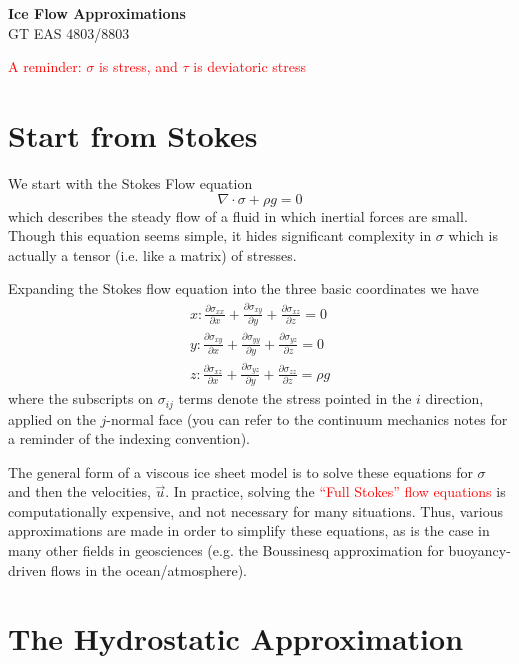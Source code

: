 \documentclass[12pt]{article}
\theoremstyle{definition}
\newcommand{\pd}[2]{\frac{\partial {#1}}{\partial {#2}}}
\begin{document}
\thispagestyle{empty}

\begin{center}
{\LARGE \bf Ice Flow Approximations}\\
{\large GT EAS 4803/8803}\\
\end{center}
\begin{center} \textcolor{red}{A reminder: $\sigma$ is stress, and $\tau$ is deviatoric stress} \end{center}
\section{Start from Stokes}
We start with the Stokes Flow equation
\begin{equation}
\nabla \cdot \sigma + \rho g = 0
\end{equation}
which describes the steady flow of a fluid in which inertial forces are small. Though this equation seems simple, it hides significant complexity in $\sigma$ which is actually a tensor (i.e. like a matrix) of stresses. \\

\begin{shaded}
Expanding the Stokes flow equation into the three basic coordinates we have
\begin{align}
x: \pd{\sigma_{xx}}{x} + \pd{\sigma_{xy}}{y} + \pd{\sigma_{xz}}{z} = 0 \\
y: \pd{\sigma_{xy}}{x} + \pd{\sigma_{yy}}{y} + \pd{\sigma_{yz}}{z} = 0 \\
z: \pd{\sigma_{xz}}{x} + \pd{\sigma_{yz}}{y} + \pd{\sigma_{zz}}{z} = \rho g
\end{align}
where the subscripts on $\sigma_{ij}$ terms denote the stress pointed in the $i$ direction, applied on the $j$-normal face (you can refer to the continuum mechanics notes for a reminder of the indexing convention). \end{shaded} 

The general form of a viscous ice sheet model is to solve these equations for $\sigma$ and then the velocities, $\vec{u}$. In practice, solving the \textcolor{red}{``Full Stokes'' flow equations} is computationally expensive, and not necessary for many situations. Thus, various approximations are made in order to simplify these equations, as is the case in many other fields in geosciences (e.g. the Boussinesq approximation for buoyancy-driven flows in the ocean/atmosphere).

\section{The Hydrostatic Approximation}
\end{document}
